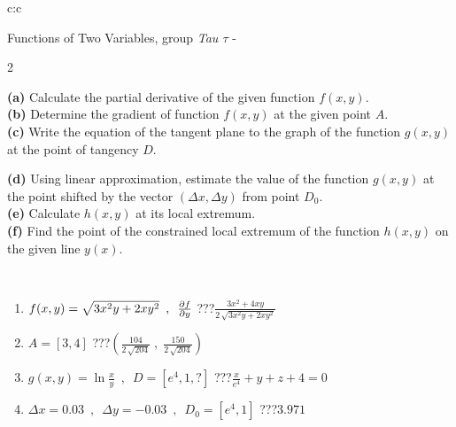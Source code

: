 \documentclass[10pt]{report}
\begin{document}
\begin{tabular}{c:c}
\begin{minipage}[c][104.5mm][t]{0.5\linewidth}
\begin{center}
\vspace{7mm}
{\huge \LARGE Functions of Two Variables, group \textit{Tau $\tau$} -}\\[5mm]
\begin{minipage}{0.95\linewidth}
\begin{center}
{\small \begin{multicols}{2} \raggedright
\textbf{(a)} Calculate the partial derivative of the given function \(f(x,y)\). \\[1mm]
\textbf{(b)} Determine the gradient of function \(f(x,y)\) at the given point \(A\). \\[1mm]
\textbf{(c)} Write the equation of the tangent plane to the graph of the function \(g(x,y)\) at the point of tangency \(D\). \par \columnbreak
\textbf{(d)} Using linear approximation, estimate the value of the function \(g(x,y)\) at the point shifted by the vector \((\Delta x, \Delta y)\) from point \(D_0\). \\[1mm]
\textbf{(e)} Calculate \(h(x,y)\) at its local extremum. \\[1mm]
\textbf{(f)} Find the point of the constrained local extremum of the function \(h(x,y)\) on the given line \(y(x)\). \\[1mm]
\end{multicols}
}
\end{center}
\end{minipage}
\\[4mm]
\begin{minipage}{0.79\linewidth}
\begin{center}
\begin{varwidth}{\linewidth}
\begin{enumerate}
\normalsizerr
\item $f(x,y) = \sqrt{3x^2y + 2xy^2}\enspace , \enspace \pdv{f}{y}$\quad \dotfill\; ???\;\dotfill \quad $\frac{3x^2+4xy}{2\,\sqrt{3x^2y+2xy^2}}$
\item $A = [3, 4]$\quad \dotfill\; ???\;\dotfill \quad $\left( \frac{104}{2\,\sqrt{204}} \;,\; \frac{150}{2\,\sqrt{204}} \right)$
\item $g(x,y) = \ln\frac{x}{y} \enspace , \enspace D=[e^{4},1,?]$\quad \dotfill\; ???\;\dotfill \quad $\frac{x}{e^4} + y + z + 4 = 0$
\item $\Delta x = {0.03} \enspace,\enspace \Delta y = {-0.03} \enspace,\enspace D_0 = [e^{4},1]$\quad \dotfill\; ???\;\dotfill \quad $3.971$

\end{enumerate}
\end{varwidth}
\end{center}
\end{minipage}
\end{center}
\end{minipage}
\end{tabular}
\end{document}

